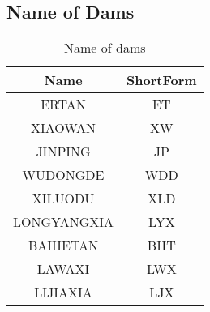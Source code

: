 \documentclass[12pt]{article}%
\begin{document}
\subsection{Name of Dams}
\begin{table}[H]
\centering
\caption{Name of dams}
\label{name}
\begin{tabular}{|cc|}
\hline
Name  &  ShortForm\\
\hline
ERTAN  &  ET\\
\hline
XIAOWAN  &  XW\\
\hline
JINPING  &  JP\\
\hline
WUDONGDE  &  WDD\\
\hline
XILUODU  &  XLD\\
\hline
LONGYANGXIA  &  LYX\\
\hline
BAIHETAN  &  BHT\\
\hline
LAWAXI  &  LWX\\
\hline
LIJIAXIA  &  LJX\\
\hline
\end{tabular}
\end{table}
\end{document}

